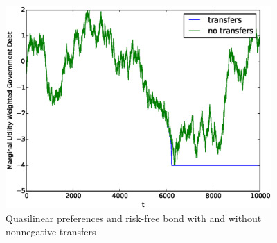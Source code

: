 \documentclass[12pt]{article}
\begin{document}
\begin{enumerate}
\begin{figure}
	\begin{center}
	\includegraphics[width=4in]{Images/transfer_example2.eps}
\caption{Quasilinear preferences and risk-free bond  with and without nonnegative transfers}
	\end{center}
\end{figure}



 \end{enumerate}


\end{document}

